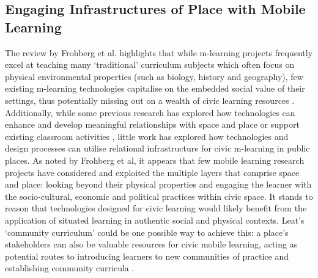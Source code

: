\subsection{Engaging Infrastructures of Place with Mobile Learning}
The review by Frohberg et al. highlights that while m-learning projects frequently excel at teaching many ‘traditional’ curriculum subjects which often focus on physical environmental properties (such as biology, history and geography), few existing m-learning technologies capitalise on the embedded social value of their settings, thus potentially missing out on a wealth of civic learning resources \citep{Frohberg2009}. Additionally, while some previous research has explored how technologies can enhance and develop meaningful relationships with space and place \citep{Giaccardi2008, Lentini2010} or support existing classroom activities \citep{Mann2016}, little work has explored how technologies and design processes can utilise relational infrastructure for civic m-learning in public places. As noted by Frohberg et al, it appears that few mobile learning research projects have considered and exploited the multiple layers that comprise space and place: looking beyond their physical properties and engaging the learner with the socio-cultural, economic and political practices within civic space. It stands to reason that technologies designed for civic learning would likely benefit from the application of situated learning in authentic social and physical contexts. Leat's `community curriculum' could be one possible way to achieve this: a place’s stakeholders can also be valuable resources for civic mobile learning, acting as potential routes to introducing learners to new communities of practice and establishing community curricula \citep{Leat2015}.

